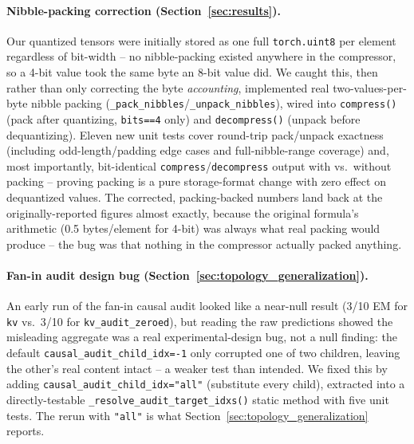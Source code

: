 \documentclass[11pt]{article}
\begin{document}
\paragraph{Nibble-packing correction (Section~\ref{sec:results}).} Our
quantized tensors were initially stored as one full \texttt{torch.uint8}
per element regardless of bit-width -- no nibble-packing existed anywhere
in the compressor, so a 4-bit value took the same byte an 8-bit value
did. We caught this, then rather than only correcting the byte
\emph{accounting}, implemented real two-values-per-byte nibble packing
(\texttt{\_pack\_nibbles}/\texttt{\_unpack\_nibbles}), wired into
\texttt{compress()} (pack after quantizing, \texttt{bits==4} only) and
\texttt{decompress()} (unpack before dequantizing). Eleven new unit tests
cover round-trip pack/unpack exactness (including odd-length/padding
edge cases and full-nibble-range coverage) and, most importantly,
bit-identical \texttt{compress}/\texttt{decompress} output with vs.\
without packing -- proving packing is a pure storage-format change with
zero effect on dequantized values. The corrected, packing-backed numbers
land back at the originally-reported figures almost exactly, because the
original formula's arithmetic (0.5 bytes/element for 4-bit) was always
what real packing would produce -- the bug was that nothing in the
compressor actually packed anything.

\paragraph{Fan-in audit design bug (Section~\ref{sec:topology_generalization}).}
An early run of the fan-in causal audit looked like a near-null result
(3/10 EM for \texttt{kv} vs.\ 3/10 for \texttt{kv\_audit\_zeroed}), but
reading the raw predictions showed the misleading aggregate was a real
experimental-design bug, not a null finding: the default
\texttt{causal\_audit\_child\_idx=-1} only corrupted one of two children,
leaving the other's real content intact -- a weaker test than intended.
We fixed this by adding \texttt{causal\_audit\_child\_idx="all"}
(substitute every child), extracted into a directly-testable
\texttt{\_resolve\_audit\_target\_idxs()} static method with five unit
tests. The rerun with \texttt{"all"} is what Section~\ref{sec:topology_generalization}
reports.
\end{document}
